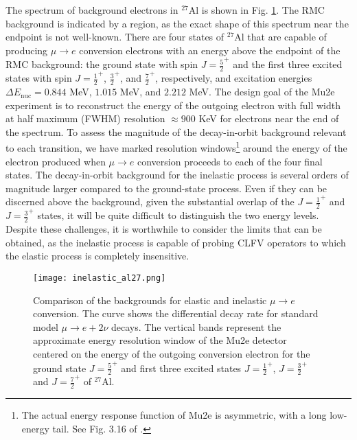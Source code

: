 \documentclass[12pt,letterpaper]{book}
\begin{document}
The spectrum of background electrons in $^{27}$Al is shown in Fig. \ref{fig:backgrounds}. The RMC background is indicated by a region, as the exact shape of this spectrum near the endpoint is not well-known. There are four states of $^{27}$Al that are capable of producing $\mu\rightarrow e$ conversion electrons with an energy above the endpoint of the RMC background: the ground state with spin $J=\frac{5}{2}^+$ and the first three excited states with spin $J=\frac{1}{2}^+$, $\frac{3}{2}^+$, and $\frac{7}{2}^+$, respectively, and excitation energies $\Delta E_\mathrm{nuc}=0.844$ MeV, $1.015$ MeV, and $2.212$ MeV. The design goal of the Mu2e experiment is to reconstruct the energy of the outgoing electron with full width at half maximum (FWHM) resolution $\approx 900$ KeV for electrons near the end of the spectrum. To assess the magnitude of the decay-in-orbit background relevant to each transition, we have marked resolution windows\footnote{The actual energy response function of Mu2e is asymmetric, with a long low-energy tail. See Fig. 3.16 of \cite{Mu2e:2014fns}.} around the energy of the electron produced when $\mu\rightarrow e$ conversion proceeds to each of the four final states. The decay-in-orbit background for the inelastic process is several orders of magnitude larger compared to the ground-state process. Even if they can be discerned above the background, given the substantial overlap of the $J=\frac{1}{2}^+$ and $J=\frac{3}{2}^+$ states, it will be quite difficult to distinguish the two energy levels. Despite these challenges, it is worthwhile to consider the limits that can be obtained, as the inelastic process is capable of probing CLFV operators to which the elastic process is completely insensitive.
\begin{figure}
\centering
\texttt{[image: inelastic\_al27.png]}
\caption{Comparison of the backgrounds for elastic and inelastic $\mu\rightarrow e$ conversion. The curve shows the differential decay rate for standard model $\mu\rightarrow e+2\nu$ decays. The vertical bands represent the approximate energy resolution window of the Mu2e detector centered on the energy of the outgoing conversion electron for the ground state $J=\frac{5}{2}^+$ and first three excited states $J=\frac{1}{2}^+$, $J=\frac{3}{2}^+$ and $J=\frac{7}{2}^+$ of $^{27}$Al.}
\label{fig:backgrounds}
\end{figure}
 
\end{document}
